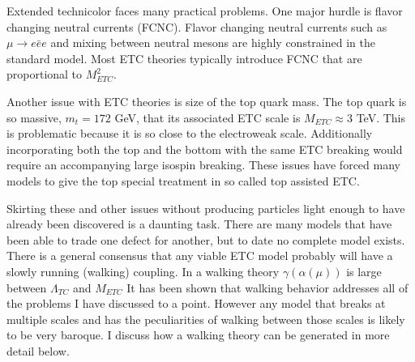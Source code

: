 Extended technicolor faces many practical problems.
One major hurdle is flavor changing neutral currents (FCNC).
Flavor changing neutral currents such as $\mu\rightarrow e\bar{e}e$ and mixing between neutral mesons are highly constrained in the standard model.
Most ETC theories typically introduce FCNC that are proportional to $M^2_{ETC}$.

Another issue with ETC theories is size of the top quark mass.
The top quark is so massive, $m_t=172$ GeV, that its associated ETC scale is $M_{ETC}\approx 3$ TeV.
This is problematic because it is so close to the electroweak scale.
Additionally incorporating both the top and the bottom with the same ETC breaking would require an accompanying large isospin breaking.
These issues have forced many models to give the top special treatment in so called top assisted ETC.

Skirting these and other issues without producing particles light enough to have already been discovered is a daunting task.
There are many models that have been able to trade one defect for another, but to date no complete model exists.
There is a general consensus that any viable ETC model probably will have a slowly running (walking) coupling.
In a walking theory $\gamma(\alpha(\mu))$ is large between $\Lambda_{TC}$ and $M_{ETC}$ 
It has been shown that walking behavior addresses all of the problems I have discussed to a point.
However any model that breaks at multiple scales and has the peculiarities of walking between those scales is likely to be very baroque.
I discuss how a walking theory can be generated in more detail below.

